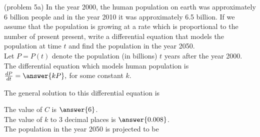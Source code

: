 \documentclass{ximera}
\begin{document}
\begin{problem}(problem 5a)
In the year 2000, the human population on earth was approximately 6 billion people and in the year 2010 it was approximately 6.5 billion. 
If we assume that the population is growing at a rate which is proportional to the number of present present,
write a differential equation that models the population at time $t$ and find the population in the year 2050.\\


Let $P = P(t)$ denote the population  (in billions)  $t$ years after the year 2000.\\
The differential equation which models human population is\\

$\frac{dP}{dt} = \answer{k P},$ for some constant $k$.

The general solution to this differential equation is 

\begin{multipleChoice}
\end{multipleChoice}

The value of $C$ is $\answer{6}$.\\
The value of $k$ to 3 decimal places is $\answer{0.008}$.\\
The population in the year 2050 is projected to be 

\begin{multipleChoice}
\end{multipleChoice}

\end{problem}
\end{document}
